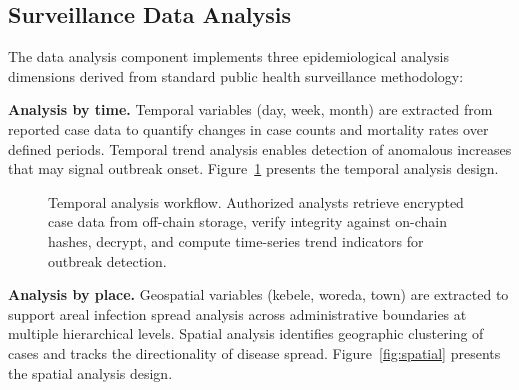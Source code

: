 \documentclass[AMA,LATO1COL]{WileyNJD-v2}
\begin{document}
\subsection{Surveillance Data Analysis}\label{subsec:analysis}

The data analysis component implements three epidemiological analysis dimensions derived from standard public health surveillance methodology:

\textbf{Analysis by time.} Temporal variables (day, week, month) are extracted from reported case data to quantify changes in case counts and mortality rates over defined periods. Temporal trend analysis enables detection of anomalous increases that may signal outbreak onset. Figure~\ref{fig:temporal} presents the temporal analysis design.

\begin{figure}[!ht]
\centering
{}
\caption{Temporal analysis workflow. Authorized analysts retrieve encrypted case data from off-chain storage, verify integrity against on-chain hashes, decrypt, and compute time-series trend indicators for outbreak detection.}\label{fig:temporal}
\end{figure}
%
%
%

\textbf{Analysis by place.} Geospatial variables (kebele, woreda, town) are extracted to support areal infection spread analysis across administrative boundaries at multiple hierarchical levels. Spatial analysis identifies geographic clustering of cases and tracks the directionality of disease spread. Figure~\ref{fig:spatial} presents the spatial analysis design.
\end{document}
